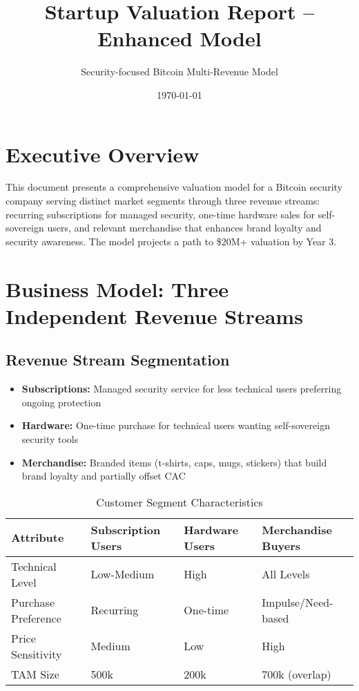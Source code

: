 \documentclass[11pt]{article}
\begin{document}
\title{Startup Valuation Report -- Enhanced Model}
\author{Security-focused Bitcoin Multi-Revenue Model}
\date{\today}
\maketitle

\section*{Executive Overview}
This document presents a comprehensive valuation model for a Bitcoin security company serving distinct market segments through three revenue streams: recurring subscriptions for managed security, one-time hardware sales for self-sovereign users, and relevant merchandise that enhances brand loyalty and security awareness. The model projects a path to \$20M+ valuation by Year 3.

\section{Business Model: Three Independent Revenue Streams}

\subsection{Revenue Stream Segmentation}
\begin{itemize}
  \item \textbf{Subscriptions:} Managed security service for less technical users preferring ongoing protection
  \item \textbf{Hardware:} One-time purchase for technical users wanting self-sovereign security tools
  \item \textbf{Merchandise:} Branded items (t-shirts, caps, mugs, stickers) that build brand loyalty and partially offset CAC
\end{itemize}

\begin{table}[htbp]
\centering
\caption{Customer Segment Characteristics}
\begin{tabularx}{\linewidth}{l X X X}
\toprule
Attribute & Subscription Users & Hardware Users & Merchandise Buyers \\\midrule
Technical Level & Low-Medium & High & All Levels \\
Purchase Preference & Recurring & One-time & Impulse/Need-based \\
Price Sensitivity & Medium & Low & High \\
TAM Size & 500k & 200k & 700k (overlap) \\
\bottomrule
\end{tabularx}
\end{table}
\end{document}
